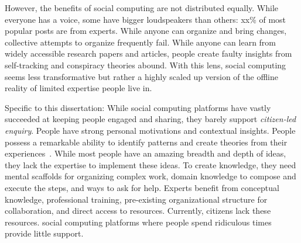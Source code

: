 However, the benefits of social computing are not distributed equally. While everyone has a voice, some have bigger loudspeakers than others: xx\% of most popular posts are from experts. While anyone can organize and bring changes, collective attempts to organize frequently fail. While anyone can learn from widely accessible research papers and articles, people create faulty insights from self-tracking and conspiracy theories abound. With this lens, social computing seems less transformative but rather a highly scaled up version of the offline reality of limited expertise people live in. 



Specific to this dissertation: While social computing platforms have vastly succeeded at keeping people engaged and sharing, they barely support \textit {citizen-led enquiry}. People have strong personal motivations and contextual insights. People possess a remarkable ability to identify patterns and create theories from their experiences~\cite{Gelman2011}. While most people have an amazing breadth and depth of ideas, they lack the expertise to implement these ideas. To create knowledge, they need mental scaffolds for organizing complex work, domain knowledge to compose and execute the steps, and ways to ask for help. Experts benefit from conceptual knowledge, professional training, pre-existing organizational structure for collaboration, and direct access to resources. Currently, citizens lack these resources. social computing platforms where people spend ridiculous times provide little support. 



